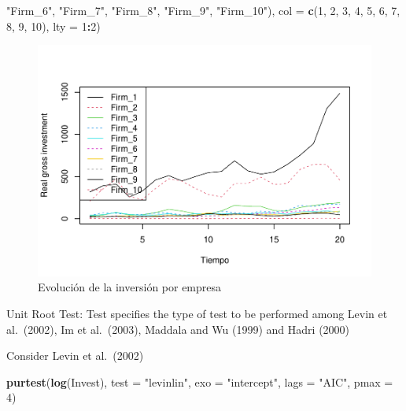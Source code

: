 \documentclass[
]{book}
\newenvironment{Shaded}{\begin{snugshade}}{\end{snugshade}}
\newcommand{\AttributeTok}[1]{\textcolor[rgb]{0.13,0.29,0.53}{#1}}
\newcommand{\DecValTok}[1]{\textcolor[rgb]{0.00,0.00,0.81}{#1}}
\newcommand{\FunctionTok}[1]{\textcolor[rgb]{0.13,0.29,0.53}{\textbf{#1}}}
\newcommand{\NormalTok}[1]{#1}
\newcommand{\SpecialCharTok}[1]{\textcolor[rgb]{0.81,0.36,0.00}{\textbf{#1}}}
\newcommand{\StringTok}[1]{\textcolor[rgb]{0.31,0.60,0.02}{#1}}
\begin{document}
\begin{Shaded}
\begin{Highlighting}[]
                           \StringTok{"Firm\_6"}\NormalTok{, }\StringTok{"Firm\_7"}\NormalTok{, }\StringTok{"Firm\_8"}\NormalTok{, }\StringTok{"Firm\_9"}\NormalTok{, }\StringTok{"Firm\_10"}\NormalTok{),}
       \AttributeTok{col =} \FunctionTok{c}\NormalTok{(}\DecValTok{1}\NormalTok{, }\DecValTok{2}\NormalTok{, }\DecValTok{3}\NormalTok{, }\DecValTok{4}\NormalTok{, }\DecValTok{5}\NormalTok{, }\DecValTok{6}\NormalTok{, }\DecValTok{7}\NormalTok{, }\DecValTok{8}\NormalTok{, }\DecValTok{9}\NormalTok{, }\DecValTok{10}\NormalTok{), }\AttributeTok{lty =} \DecValTok{1}\SpecialCharTok{:}\DecValTok{2}\NormalTok{)}
\end{Highlighting}
\end{Shaded}

\begin{figure}

{\centering \includegraphics{Notas-Series-Tiempo_files/figure-latex/fig111-1} 

}

\caption{Evolución de la inversión por empresa}\label{fig:fig111}
\end{figure}

Unit Root Test: Test specifies the type of test to be performed among Levin et al.~(2002), Im et al.~(2003), Maddala and Wu (1999) and Hadri (2000)

Consider Levin et al.~(2002)

\begin{Shaded}
\begin{Highlighting}[]
\FunctionTok{purtest}\NormalTok{(}\FunctionTok{log}\NormalTok{(Invest), }\AttributeTok{test =} \StringTok{"levinlin"}\NormalTok{, }\AttributeTok{exo =} \StringTok{"intercept"}\NormalTok{, }
        \AttributeTok{lags =} \StringTok{"AIC"}\NormalTok{, }\AttributeTok{pmax =} \DecValTok{4}\NormalTok{)}
\end{Highlighting}
\end{Shaded}
\end{document}
